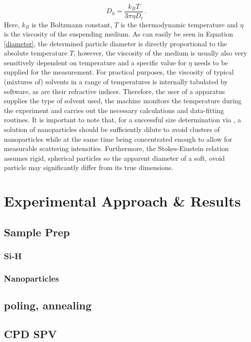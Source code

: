 \begin{equation}
\label{diameter}
	D_h = \frac{k_B T}{3\pi \eta D_t} \, .
\end{equation}
Here, $k_B$ is the Boltzmann constant, $T$ is the thermodynamic temperature and $\eta$ is the viscosity of the suspending medium. As can easily be seen in Equation \eqref{diameter}, the determined particle diameter is directly proportional to the absolute temperature $T$, however, the viscosity of the medium is usually also very sensitively dependent on temperature and a specific value for $\eta$ needs to be supplied for the measurement. For practical purposes, the viscosity of typical (mixtures of) solvents in a range of temperatures is internally tabulated by software, as are their refractive indices. Therefore, the user of a \dls{} apparatus supplies the type of solvent used, the machine monitors the temperature during the experiment and carries out the necessary calculations and data-fitting routines. It is important to note that, for a successful size determination via \dls{}, a solution of nanoparticles should be sufficiently dilute to avoid clusters of nanoparticles while at the same time being concentrated enough to allow for measurable scattering intensities. Furthermore, the Stokes-Einstein relation assumes rigid, spherical particles so the apparent diameter of a soft, ovoid particle may significantly differ from its true dimensions.

\section{Experimental Approach \& Results}
\label{sec:expwork}
\subsection{Sample Prep}
\subsubsection{Si-H}
\subsubsection{Nanoparticles}
\subsection{\pvdf{} poling, annealing}
\subsection{CPD SPV}
